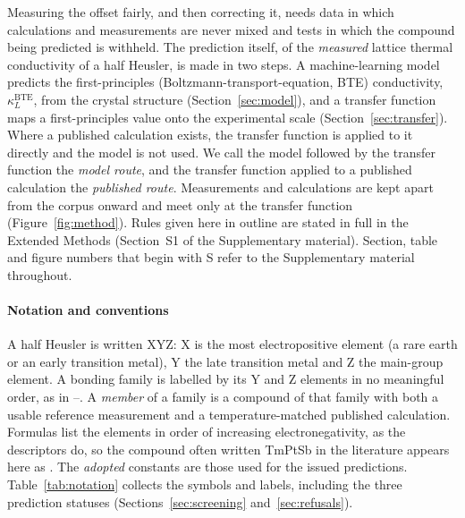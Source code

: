 Measuring the offset fairly, and then correcting it, needs data in which calculations and
measurements are never mixed and tests in which the compound being predicted is withheld. The
prediction itself, of the \emph{measured} lattice thermal conductivity of a half Heusler, is made in
two steps. A machine-learning model predicts the first-principles (Boltzmann-transport-equation, BTE)
conductivity, $\kappa_L^{\mathrm{BTE}}$, from the crystal structure (Section~\ref{sec:model}), and a
transfer function maps a first-principles value onto the experimental scale
(Section~\ref{sec:transfer}). Where a published calculation exists, the transfer function is applied to it directly and the model
is not used. We call the model followed by the transfer function the \emph{model route}, and the
transfer function applied to a published calculation the \emph{published route}. Measurements and calculations are kept apart from the
corpus onward and meet only at the transfer function (Figure~\ref{fig:method}). Rules given here in
outline are stated in full in the Extended Methods (Section~S1 of the Supplementary material).
Section, table and figure numbers that begin with S refer to the Supplementary material throughout.

\paragraph{Notation and conventions} A half Heusler is written XYZ: X is the most electropositive
element (a rare earth or an early transition metal), Y the late transition metal and Z the
main-group element. A bonding family is labelled by its Y and Z elements in no meaningful order, as
in --. A \emph{member} of a family is a compound of that family with both a usable
reference measurement and a temperature-matched published calculation. Formulas list the elements in order of increasing electronegativity, as the
descriptors do, so the compound often written TmPtSb in the literature appears here as .
The \emph{adopted} constants are those used for the issued predictions. Table~\ref{tab:notation}
collects the symbols and labels, including the three prediction statuses
(Sections~\ref{sec:screening} and~\ref{sec:refusals}).

